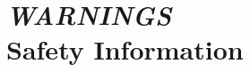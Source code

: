 \documentclass[twoside,12pt,openright,final,english]{memoir}
\newif\iftitle\titletrue
\newif\ifcopyright\copyrighttrue
\newif\ifwarnings\warningstrue %
\newif\ifsetup\setupfalse %
\newif\iffilament\filamentfalse %
\begin{document}
\frontmatter


\iftitle
{}
\fi

\ifcopyright
{}
\fi


\renewcommand{\cftchapterdotsep}{15}
\renewcommand{\cftdot}{\textperiodcentered}	%
\setlength{\cftbeforechapterskip}{5pt}  %
\tableofcontents*

\renewcommand*{\lofheadstart}{\vspace{1cm}}
\clearpage
\listoffigures*

\def\topblockvspace{0.11}


\ifwarnings
\chapter{\emph{WARNINGS}\protect \\
{Safety Information}}
\thispagestyle{empty}
{}
\fi

\mainmatter*


\ifsetup
\chapter{\emph{Setup Your Printer}}
\thispagestyle{empty}
\markboth{Setup Your Printer}{LulzBot TAZ User Manual}
{}
\fi

\iffilament
\chapter{\emph{Loading Filament}}
\thispagestyle{empty}
\markboth{Loading Filament}{LulzBot TAZ User Manual}
{}
\fi
\end{document}
